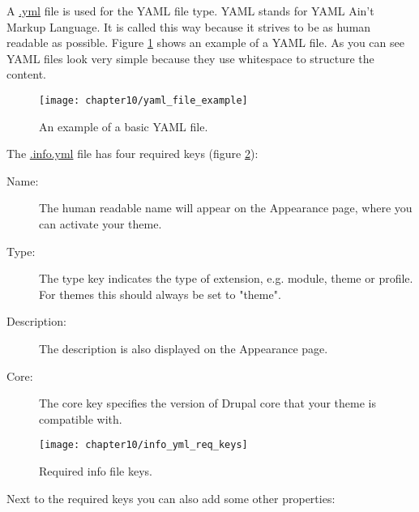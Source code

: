 A \url{.yml} file is used for the YAML file type. YAML stands for YAML Ain't Markup Language. It is called this way because it strives to be as human readable as possible. Figure \ref{fig:yaml_file_example} shows an example of a YAML file. As you can see YAML files look very simple because they use whitespace to structure the content. 

\begin{figure}[H]
	\centering
	\texttt{[image: chapter10/yaml\_file\_example]}
	\caption{An example of a basic YAML file.}
	\label{fig:yaml_file_example}
\end{figure}

The \url{.info.yml} file has four required keys (figure \ref{fig:info_yml_req_keys}):
\begin{description}
	\item[Name:] The human readable name will appear on the Appearance page, where you can activate your theme.
	\item[Type:] The type key indicates the type of extension, e.g. module, theme or profile. For themes this should always be set to "theme".
	\item[Description:] The description is also displayed on the Appearance page.
	\item[Core:] The core key specifies the version of Drupal core that your theme is compatible with.
\end{description}

\begin{figure}[H]
	\centering
	\texttt{[image: chapter10/info\_yml\_req\_keys]}
	\caption{Required info file keys.}
	\label{fig:info_yml_req_keys}
\end{figure}

Next to the required keys you can also add some other properties:

